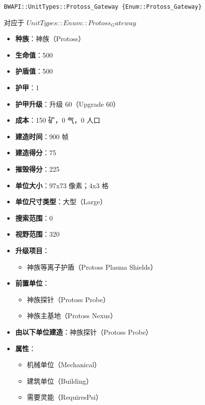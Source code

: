 \begin{tcolorbox}[colback=white, colframe=black!60!white, title=Protoss\_Gateway(), arc=0mm]
    \begin{verbatim}
BWAPI::UnitTypes::Protoss_Gateway {Enum::Protoss_Gateway}
    \end{verbatim}
    对应于  $ UnitTypes::Enum::Protoss_Gateway $ 
    \begin{itemize}
        \item \textbf{种族}：神族（Protoss）
        \item \textbf{生命值}：500
        \item \textbf{护盾值}：500
        \item \textbf{护甲}：1
        \item \textbf{护甲升级}：升级 60（Upgrade 60）
        \item \textbf{成本}：150 矿，0 气，0 人口
        \item \textbf{建造时间}：900 帧
        \item \textbf{建造得分}：75
        \item \textbf{摧毁得分}：225
        \item \textbf{单位大小}：97x73 像素；4x3 格
        \item \textbf{单位尺寸类型}：大型（Large）
        \item \textbf{搜索范围}：0
        \item \textbf{视野范围}：320
        \item \textbf{升级项目}：
            \begin{itemize}
                \item 神族等离子护盾（Protoss Plasma Shields）
            \end{itemize}
        \item \textbf{前置单位}：
            \begin{itemize}
                \item 神族探针（Protoss Probe）
                \item 神族主基地（Protoss Nexus）
            \end{itemize}
        \item \textbf{由以下单位建造}：神族探针（Protoss Probe）
        \item \textbf{属性}：
            \begin{itemize}
                \item 机械单位（Mechanical）
                \item 建筑单位（Building）
                \item 需要灵能（RequiresPsi）
            \end{itemize}
    \end{itemize}
\end{tcolorbox}

